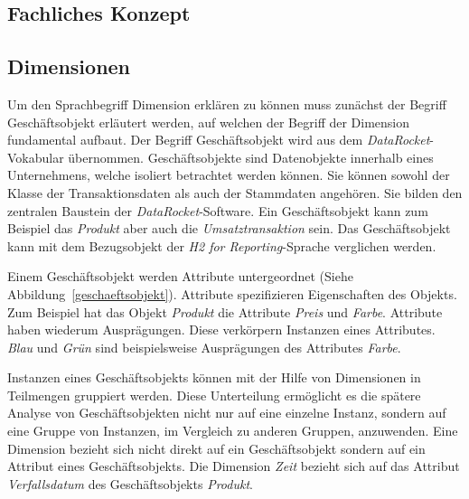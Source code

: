 \documentclass[
  language=german, %
  type=bachelor%
]{isthesis}
\begin{document}
\begin{content}
  \section{Fachliches Konzept}

  \subsection{Dimensionen}
  Um den Sprachbegriff Dimension erklären zu können muss zunächst der Begriff
  Geschäftsobjekt erläutert werden, auf welchen der Begriff der Dimension
  fundamental aufbaut. Der Begriff Geschäftsobjekt wird aus dem
  \textit{DataRocket}-Vokabular übernommen. Geschäftsobjekte sind Datenobjekte
  innerhalb eines Unternehmens, welche isoliert betrachtet werden können. Sie
  können sowohl der Klasse der Transaktionsdaten als auch der Stammdaten
  angehören. Sie bilden den zentralen Baustein der
  \textit{DataRocket}-Software. Ein Geschäftsobjekt kann zum Beispiel das
  \textit{Produkt} aber auch die \textit{Umsatztransaktion} sein.  Das
  Geschäftsobjekt kann mit dem Bezugsobjekt der \textit{H2 for
  Reporting}-Sprache verglichen werden. 

  \begin{figure}[caption={Teilsprache---Geschäftsobjekt}, label={geschaeftsobjekt}]
    \resizebox{200px}{!}{}
  \end{figure}

  Einem Geschäftsobjekt werden Attribute untergeordnet (Siehe
  Abbildung~\ref{geschaeftsobjekt}). Attribute spezifizieren Eigenschaften des
  Objekts. Zum Beispiel hat das Objekt \textit{Produkt} die Attribute
  \textit{Preis} und \textit{Farbe}. Attribute haben wiederum Ausprägungen.
  Diese verkörpern Instanzen eines Attributes. \textit{Blau} und \textit{Grün}
  sind beispielsweise Ausprägungen des Attributes \textit{Farbe}.
  
  Instanzen eines Geschäftsobjekts können mit der Hilfe von Dimensionen in
  Teilmengen gruppiert werden. Diese Unterteilung ermöglicht es die spätere
  Analyse von Geschäftsobjekten nicht nur auf eine einzelne Instanz, sondern auf
  eine Gruppe von Instanzen, \ggf{} im Vergleich zu anderen Gruppen,
  anzuwenden.  Eine Dimension bezieht sich nicht direkt auf ein Geschäftsobjekt
  sondern auf ein Attribut eines Geschäftsobjekts. Die Dimension \textit{Zeit}
  bezieht sich \zB{} auf das Attribut \textit{Verfallsdatum} des
  Geschäftsobjekts \textit{Produkt}. 


\end{content}
\end{document}
